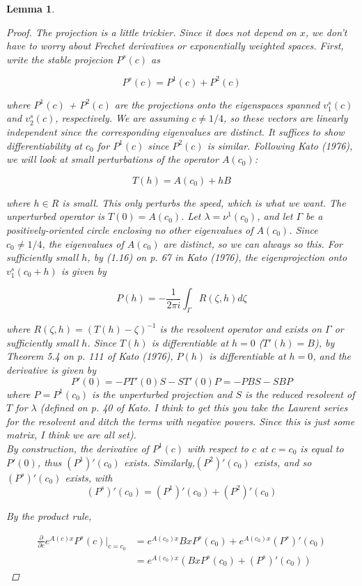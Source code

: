 \documentclass[12pt]{article}
\newtheorem{lemma}{Lemma}
\begin{document}
\begin{lemma}
\begin{proof}
The projection is a little trickier. Since it does not depend on $x$, we don't have to worry about Frechet derivatives or exponentially weighted spaces. First, write the stable projecion $P^s(c)$ as

\[
P^s(c) = P^1(c) + P^2(c)
\]

where $P^1(c)$ + $P^2(c)$ are the projections onto the eigenspaces spanned $v_1^s(c)$ and $v_2^s(c)$, respectively. We are assuming $c \neq 1/4$, so these vectors are linearly independent since the corresponding eigenvalues are distinct. It suffices to show differentiability at $c_0$ for $P^1(c)$ since $P^2(c)$ is similar. Following Kato (1976), we will look at small perturbations of the operator $A(c_0)$:

\[
T(h) = A(c_0) + h B
\]

where $h \in R$ is small. This only perturbs the speed, which is what we want. The unperturbed operator is $T(0) = A(c_0)$. Let $\lambda = \nu^1(c_0)$, and let $\Gamma$ be a positively-oriented circle enclosing no other eigenvalues of $A(c_0)$. Since $c_0 \neq 1/4$, the eigenvalues of $A(c_0)$ are distinct, so we can always so this. For sufficiently small $h$, by (1.16) on p. 67 in Kato (1976), the eigenprojection onto $v_1^s(c_0 + h)$ is given by 

\[
P(h) = -\frac{1}{2 \pi i} \int_\Gamma R(\zeta, h) d \zeta
\]

where $R(\zeta, h) = (T(h) - \zeta)^{-1}$ is the resolvent operator and exists on $\Gamma$ or sufficiently small $h$. Since $T(h)$ is differentiable at $h = 0$ ($T'(h) = B$), by Theorem 5.4 on p. 111 of Kato (1976), $P(h)$ is differentiable at $h = 0$, and the derivative is given by
\[
P'(0) = -P T'(0) S - S T'(0) P = -P B S - S B P
\]
where $P = P^1(c_0)$ is the unperturbed projection and $S$ is the reduced resolvent of $T$ for $\lambda$ (defined on p. 40 of Kato. I think to get this you take the Laurent series for the resolvent and ditch the terms with negative powers. Since this is just some matrix, I think we are all set).\\

By construction, the derivative of $P^1(c)$ with respect to $c$ at $c = c_0$ is equal to $P'(0)$, thus $(P^1)'(c_0)$ exists. Similarly,$(P^2)'(c_0)$ exists, and so $(P^s)'(c_0)$ exists, with
\[
(P^s)'(c_0) = (P^1)'(c_0) + (P^2)'(c_0)
\]

By the product rule,

\begin{align*}
\frac{\partial}{\partial c} e^{A(c)x}P^s(c)\Big|_{c = c_0} &= e^{A(c_0)x} B x P^s(c_0) + e^{A(c_0)x} (P^s)'(c_0) \\
&= e^{A(c_0)x} ( BxP^s(c_0) + (P^s)'(c_0) )
\end{align*}

\end{proof}
\end{lemma}
\end{document}
